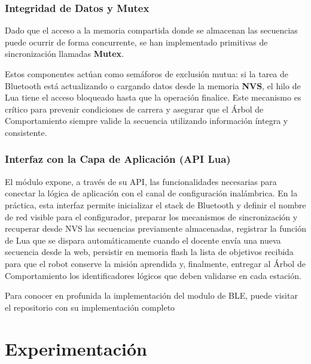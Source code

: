 \documentclass{prgrado}
\begin{document}
\subsection{Integridad de Datos y Mutex}
Dado que el acceso a la memoria compartida donde se almacenan las secuencias puede ocurrir de forma concurrente, se han implementado primitivas de sincronización llamadas \textbf{Mutex}. 

Estos componentes actúan como semáforos de exclusión mutua: si la tarea de Bluetooth está actualizando o cargando datos desde la memoria \textbf{NVS}, el hilo de Lua tiene el acceso bloqueado hasta que la operación finalice. Este mecanismo es crítico para prevenir condiciones de carrera y asegurar que el Árbol de Comportamiento siempre valide la secuencia utilizando información íntegra y consistente.


\subsection{Interfaz con la Capa de Aplicación (API Lua)}
El módulo expone, a través de su API, las funcionalidades necesarias para conectar la lógica de aplicación con el canal de configuración inalámbrica. En la práctica, esta interfaz permite inicializar el stack de Bluetooth y definir el nombre de red visible para el configurador, preparar los mecanismos de sincronización y recuperar desde NVS las secuencias previamente almacenadas, registrar la función de Lua que se dispara automáticamente cuando el docente envía una nueva secuencia desde la web, persistir en memoria flash la lista de objetivos recibida para que el robot conserve la misión aprendida y, finalmente, entregar al Árbol de Comportamiento los identificadores lógicos que deben validarse en cada estación.

Para conocer en profunida la implementación del modulo de BLE, puede visitar el repositorio con su implementación completo \cite{robotito2026hardware}




\chapter{Experimentación}
\label{cap:experimentacion}
\end{document}
